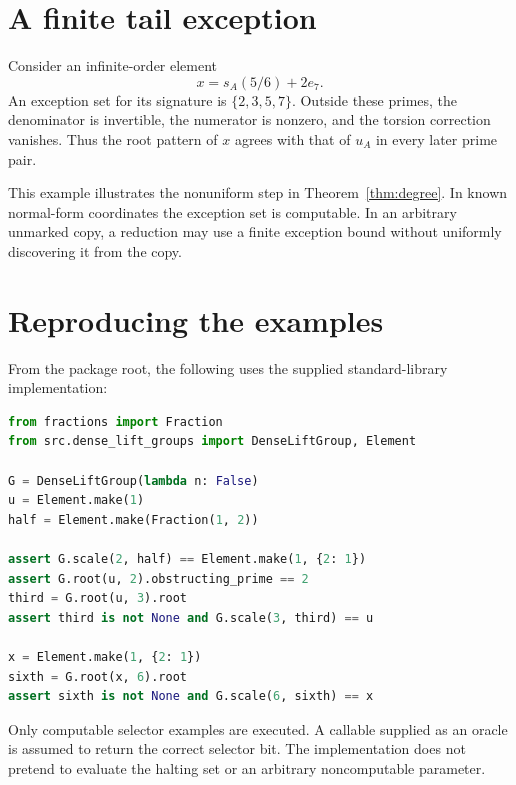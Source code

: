 \section{A finite tail exception}
Consider an infinite-order element
\[
x=s_A(5/6)+2e_7.
\]
An exception set for its signature is $\{2,3,5,7\}$. Outside these primes, the denominator is invertible, the numerator is nonzero, and the torsion correction vanishes. Thus the root pattern of $x$ agrees with that of $u_A$ in every later prime pair.

This example illustrates the nonuniform step in Theorem~\ref{thm:degree}. In known normal-form coordinates the exception set is computable. In an arbitrary unmarked copy, a reduction may use a finite exception bound without uniformly discovering it from the copy.

\section{Reproducing the examples}
From the package root, the following uses the supplied standard-library implementation:
\begin{lstlisting}[language=Python]
from fractions import Fraction
from src.dense_lift_groups import DenseLiftGroup, Element

G = DenseLiftGroup(lambda n: False)
u = Element.make(1)
half = Element.make(Fraction(1, 2))

assert G.scale(2, half) == Element.make(1, {2: 1})
assert G.root(u, 2).obstructing_prime == 2
third = G.root(u, 3).root
assert third is not None and G.scale(3, third) == u

x = Element.make(1, {2: 1})
sixth = G.root(x, 6).root
assert sixth is not None and G.scale(6, sixth) == x
\end{lstlisting}
Only computable selector examples are executed. A callable supplied as an oracle is assumed to return the correct selector bit. The implementation does not pretend to evaluate the halting set or an arbitrary noncomputable parameter.
